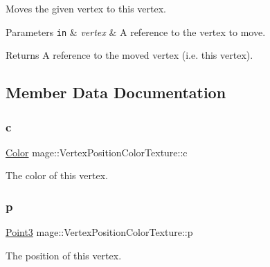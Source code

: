 Moves the given vertex to this vertex.


\begin{DoxyParams}[1]{Parameters}
\mbox{\tt in}  & {\em vertex} & A reference to the vertex to move. \\
\hline
\end{DoxyParams}
\begin{DoxyReturn}{Returns}
A reference to the moved vertex (i.\+e. this vertex). 
\end{DoxyReturn}


\subsection{Member Data Documentation}
\hypertarget{structmage_1_1_vertex_position_color_texture_afb9ec100ec42e83e501448d4bb0ee4f8}{}\label{structmage_1_1_vertex_position_color_texture_afb9ec100ec42e83e501448d4bb0ee4f8} 
\subsubsection{\texorpdfstring{c}{c}}
{\footnotesize\ttfamily \hyperlink{structmage_1_1_color}{Color} mage\+::\+Vertex\+Position\+Color\+Texture\+::c}

The color of this vertex. \hypertarget{structmage_1_1_vertex_position_color_texture_a145c2e2fce90b07252b778b46e31ea24}{}\label{structmage_1_1_vertex_position_color_texture_a145c2e2fce90b07252b778b46e31ea24} 
\subsubsection{\texorpdfstring{p}{p}}
{\footnotesize\ttfamily \hyperlink{structmage_1_1_point3}{Point3} mage\+::\+Vertex\+Position\+Color\+Texture\+::p}

The position of this vertex. \hypertarget{structmage_1_1_vertex_position_color_texture_a19df72ffa15fae0b389b9f66d7b8f3bd}{}\label{structmage_1_1_vertex_position_color_texture_a19df72ffa15fae0b389b9f66d7b8f3bd} 
